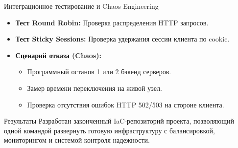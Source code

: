 \documentclass{beamer}
\begin{document}
\begin{frame}{Интеграционное тестирование и Chaos Engineering}
    \begin{itemize}
        \item \textbf{Тест Round Robin:} Проверка распределения HTTP запросов.
        \item \textbf{Тест Sticky Sessions:} Проверка удержания сессии клиента по cookie.
        \item \textbf{Сценарий отказа (Chaos):}
        \begin{itemize}
            \item Программный останов 1 или 2 бэкенд серверов.
            \item Замер времени переключения на живой узел.
            \item Проверка отсутствия ошибок HTTP 502/503 на стороне клиента.
        \end{itemize}
    \end{itemize}
\end{frame}

\begin{frame}{Результаты}
    Разработан законченный IaC-репозиторий проекта, позволяющий одной командой развернуть готовую инфраструктуру с балансировкой, мониторингом и системой контроля надежности.
\end{frame}
\end{document}
